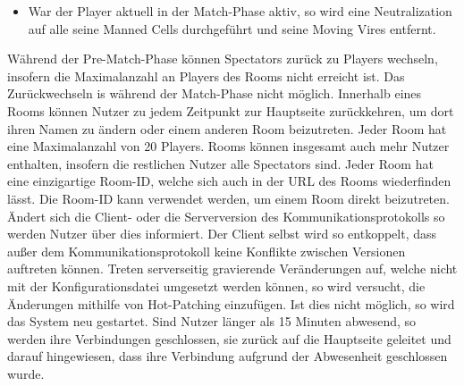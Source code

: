 \begin{description}
\begin{itemize}
			\item War der Player aktuell in der Match-Phase aktiv, so wird eine Neutralization auf alle seine Manned Cells durchgeführt und seine Moving Vires entfernt.
		\end{itemize}
		Während der Pre-Match-Phase können Spectators zurück zu Players wechseln, insofern die Maximalanzahl an Players des Rooms nicht erreicht ist. Das Zurückwechseln is während der Match-Phase nicht möglich.
		Innerhalb eines Rooms können Nutzer zu jedem Zeitpunkt zur Hauptseite zurückkehren, um dort ihren Namen zu ändern oder einem anderen Room beizutreten.
		Jeder Room hat eine Maximalanzahl von 20 Players. Rooms können insgesamt auch mehr Nutzer enthalten, insofern die restlichen Nutzer alle Spectators sind.
		Jeder Room hat eine einzigartige Room-ID, welche sich auch in der URL des Rooms wiederfinden lässt. Die Room-ID kann verwendet werden, um einem Room direkt beizutreten.
		Ändert sich die Client- oder die Serverversion des Kommunikationsprotokolls so werden Nutzer über dies informiert. Der Client selbst wird so entkoppelt, dass außer dem Kommunikationsprotokoll keine Konflikte zwischen Versionen auftreten können. Treten serverseitig gravierende Veränderungen auf, welche nicht mit der Konfigurationsdatei umgesetzt werden können, so wird versucht, die Änderungen mithilfe von Hot-Patching einzufügen. Ist dies nicht möglich, so wird das System neu gestartet.
		Sind Nutzer länger als 15 Minuten abwesend, so werden ihre Verbindungen geschlossen, sie zurück auf die Hauptseite geleitet und darauf hingewiesen, dass ihre Verbindung aufgrund der Abwesenheit geschlossen wurde.
\end{description}

